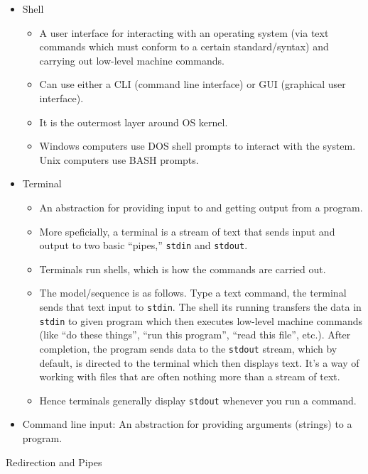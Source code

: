 \documentclass[12pt]{article}
\theoremstyle{plain}
\theoremstyle{definition}
\theoremstyle{remark}
\begin{document}
\begin{itemize}
  \item Shell
    \begin{itemize}
      \item A user interface for interacting with an operating system (via
        text commands which must conform to a certain standard/syntax) and
        carrying out low-level machine commands.
      \item Can use either a CLI (command line interface) or GUI (graphical
        user interface).
      \item It is the outermost layer around OS kernel.
      \item Windows computers use DOS shell prompts to interact with the
        system. Unix computers use BASH prompts.
    \end{itemize}

  \item Terminal
    \begin{itemize}
      \item An abstraction for providing input to and getting output from a
        program.
      \item More speficially, a terminal is a stream of text that sends
        input and output to two basic ``pipes,'' \texttt{stdin} and
        \texttt{stdout}.
      \item Terminals run shells, which is how the commands are carried
        out.
      \item
        The model/sequence is as follows.
        Type a text command, the terminal sends that text input to
        \texttt{stdin}.
        The shell its running transfers the data in \texttt{stdin} to
        given program which then executes low-level machine commands
        (like ``do these things'', ``run this program'', ``read this
        file'', etc.).
        After completion, the program sends data to the \texttt{stdout}
        stream, which by default, is directed to the terminal which then
        displays text.
        It's a way of working with files that are often nothing more than a
        stream of text.
      \item Hence terminals generally display \texttt{stdout} whenever
        you run a command.
    \end{itemize}

  \item Command line input:
    An abstraction for providing arguments (strings) to a program.
\end{itemize}
Redirection and Pipes
\end{document}
